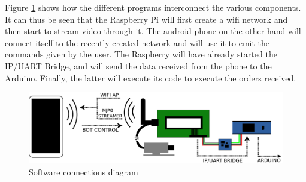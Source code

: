 Figure \ref{swDiagram} shows how the different programs interconnect the various components. It can thus be seen that the Raspberry Pi will first create a wifi network and then start to stream video through it. The android phone on the other hand will connect itself to the recently created network and will use it to emit the commands given by the user. The Raspberry will have already started the IP/UART Bridge, and will send the data received from the phone to the Arduino. Finally, the latter will execute its code to execute the orders received.\\

	\begin{figure}[H]
			\centering
			\includegraphics[width=15cm, angle=0]{images/Diagrams/software.png}
			\caption{Software connections diagram }
			\label{swDiagram}
	\end{figure}
	\bigskip


